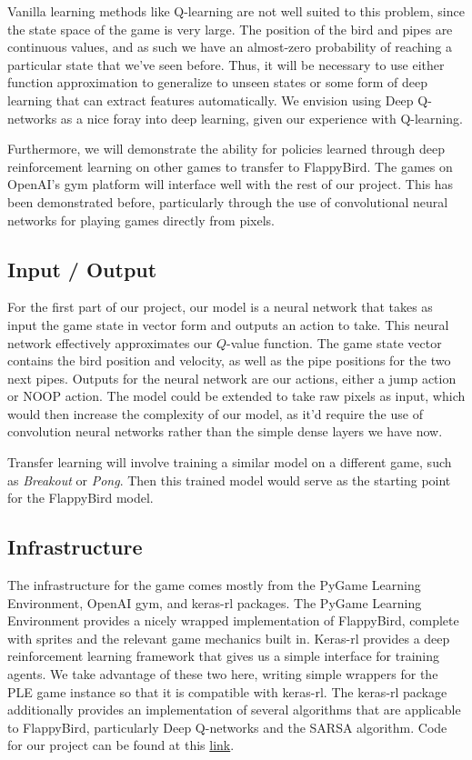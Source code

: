 \documentclass{article}
\begin{document}
Vanilla learning methods like Q-learning are not well suited to this problem, since the state space of the game is very large. The position of the bird and pipes are continuous values, and as such we have an almost-zero probability of reaching a particular state that we've seen before.
Thus, it will be necessary to use either function approximation to generalize to unseen states or some form of deep learning that can extract features automatically.
We envision using Deep Q-networks as a nice foray into deep learning, given our experience with Q-learning.

Furthermore, we will demonstrate the ability for policies learned through deep reinforcement learning on  other games to transfer to FlappyBird.
The games on OpenAI's gym platform will interface well with the rest of our project. \cite{openaigym} \cite{ale}
This has been demonstrated before, particularly through the use of convolutional neural networks for playing games directly from pixels. \cite{deepmind}


\subsection{Input / Output}

For the first part of our project, our model is a neural network that takes as input the game state in vector form and outputs an action to take. 
This neural network effectively approximates our $Q$-value function.
The game state vector contains the bird position and velocity, as well as the pipe positions for the two next pipes.
Outputs for the neural network are our actions, either a jump action or NOOP action.
The model could be extended to take raw pixels as input, which would then increase the complexity of our model, as it'd require the use of convolution neural networks rather than the simple dense layers we have now.

Transfer learning will involve training a similar model on a different game, such as \textit{Breakout} or \textit{Pong}.
Then this trained model would serve as the starting point for the FlappyBird model.

\subsection{Infrastructure}

The infrastructure for the game comes mostly from the PyGame Learning Environment, OpenAI gym, and keras-rl packages. 
The PyGame Learning Environment provides a nicely wrapped implementation of FlappyBird, complete with sprites and the relevant game mechanics built in. \cite{ple}
Keras-rl provides a deep reinforcement learning framework that gives us a simple interface for training agents. 
We take advantage of these two here, writing simple wrappers for the PLE game instance so that it is compatible with keras-rl. \cite{kerasrl}
The keras-rl package additionally provides an implementation of several algorithms that are applicable to FlappyBird, particularly Deep Q-networks and the SARSA algorithm.
Code for our project can be found at this \href{https://github.com/cdrckrgt/cs221-project} {link}.
\end{document}
